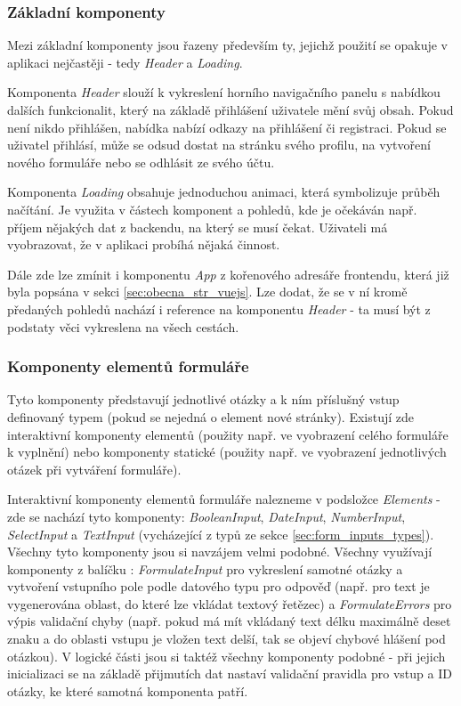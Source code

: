 		\subsubsection{Základní komponenty} %
		Mezi základní komponenty jsou řazeny především ty, jejichž použití se opakuje v aplikaci nejčastěji - tedy \textit{Header} a \textit{Loading}. 
		
		Komponenta \textit{Header} slouží k vykreslení horního navigačního panelu s nabídkou dalších funkcionalit, který na základě přihlášení uživatele mění svůj obsah. Pokud není nikdo přihlášen, nabídka nabízí odkazy na přihlášení či registraci. Pokud se uživatel přihlásí, může se odsud dostat na stránku svého profilu, na vytvoření nového formuláře nebo se odhlásit ze svého účtu.
		
		Komponenta \textit{Loading} obsahuje jednoduchou animaci, která symbolizuje průběh načítání. Je využita v částech komponent a pohledů, kde je očekáván např. příjem nějakých dat z backendu, na který se musí čekat. Uživateli má vyobrazovat, že v aplikaci probíhá nějaká činnost.
		
		Dále zde lze zmínit i komponentu \textit{App} z kořenového adresáře frontendu, která již byla popsána v sekci \ref{sec:obecna_str_vuejs}. Lze dodat, že se v ní kromě předaných pohledů nachází i reference na komponentu \textit{Header} - ta musí být z podstaty věci vykreslena na všech cestách.
		
		\subsubsection{Komponenty elementů formuláře} %
		Tyto komponenty představují jednotlivé otázky a k ním příslušný vstup definovaný typem (pokud se nejedná o element nové stránky). Existují zde interaktivní komponenty elementů (použity např. ve vyobrazení celého formuláře k vyplnění) nebo komponenty statické (použity např. ve vyobrazení jednotlivých otázek při vytváření formuláře).
		
		Interaktivní komponenty elementů formuláře nalezneme v podsložce \textit{Elements} - zde se nachází tyto komponenty: \textit{BooleanInput}, \textit{DateInput}, \textit{NumberInput}, \textit{SelectInput} a \textit{TextInput} (vycházející z typů ze sekce \ref{sec:form_inputs_types}). Všechny tyto komponenty jsou si navzájem velmi podobné. Všechny využívají komponenty z balíčku : \textit{FormulateInput} pro vykreslení samotné otázky a vytvoření vstupního pole podle datového typu pro odpověď (např. pro text je vygenerována oblast, do které lze vkládat textový řetězec) a \textit{FormulateErrors} pro výpis validační chyby (např. pokud má mít vkládaný text délku maximálně deset znaku a do oblasti vstupu je vložen text delší, tak se objeví chybové hlášení pod otázkou). V logické části jsou si taktéž všechny komponenty podobné - při jejich inicializaci se na základě přijmutích dat nastaví validační pravidla pro vstup a ID otázky, ke které samotná komponenta patří.
		
